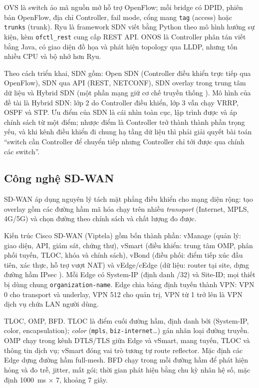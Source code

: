 OVS \citep{pfaff2015ovs, ovs_docs} là switch ảo mã nguồn mở hỗ trợ OpenFlow; mỗi bridge có DPID, phiên bản OpenFlow, địa chỉ Controller, fail mode, cổng mang \texttt{tag} (access) hoặc \texttt{trunks} (trunk). Ryu \citep{ryu_434_docs} là framework SDN viết bằng Python theo mô hình hướng sự kiện, kèm \texttt{ofctl\_rest} cung cấp REST API. ONOS \citep{onos_docs} là Controller phân tán viết bằng Java, có giao diện đồ họa và phát hiện topology qua LLDP, nhưng tốn nhiều CPU và bộ nhớ hơn Ryu.

Theo cách triển khai, SDN gồm: Open SDN (Controller điều khiển trực tiếp qua OpenFlow), SDN qua API (REST, NETCONF), SDN overlay trong trung tâm dữ liệu và Hybrid SDN (một phần mạng giữ cơ chế truyền thống \citep{vissicchio2014hybrid}). Mô hình của đề tài là Hybrid SDN: lớp 2 do Controller điều khiển, lớp 3 vẫn chạy VRRP, OSPF và STP. Ưu điểm của SDN là cái nhìn toàn cục, lập trình được và áp chính sách từ một điểm; nhược điểm là Controller trở thành thành phần trọng yếu, và khi kênh điều khiển đi chung hạ tầng dữ liệu thì phải giải quyết bài toán ``switch cần Controller để chuyển tiếp nhưng Controller chỉ tới được qua chính các switch''.

\subsection{Công nghệ SD-WAN}

SD-WAN \citep{yang2019sdwan, fu2024sdwan} áp dụng nguyên lý tách mặt phẳng điều khiển cho mạng diện rộng: tạo overlay gồm các đường hầm mã hóa chạy trên nhiều \textit{transport} (Internet, MPLS, 4G/5G) và chọn đường theo chính sách và chất lượng đo được.

Kiến trúc Cisco SD-WAN (Viptela) \citep{cisco_sdwan_design} gồm bốn thành phần: vManage (quản lý: giao diện, API, giám sát, chứng thư), vSmart (điều khiển: trung tâm OMP, phân phối tuyến, TLOC, khóa và chính sách), vBond (điều phối: điểm tiếp xúc đầu tiên, xác thực, hỗ trợ vượt NAT) và vEdge/cEdge (dữ liệu: router tại site, dựng đường hầm IPsec \citep{rfc4301_ipsec, rfc4303_esp}). Mỗi Edge có System-IP (định danh /32) và Site-ID; mọi thiết bị dùng chung \texttt{organization-name}. Edge chia bảng định tuyến thành VPN: VPN 0 cho transport và underlay, VPN 512 cho quản trị, VPN từ 1 trở lên là VPN dịch vụ chứa LAN người dùng.

TLOC, OMP, BFD. TLOC là điểm cuối đường hầm, định danh bởi (System-IP, color, encapsulation); \textit{color} (\texttt{mpls}, \texttt{biz-internet}\ldots) gán nhãn loại đường truyền. OMP \citep{cisco_sdwan_omp} chạy trong kênh DTLS/TLS giữa Edge và vSmart, mang tuyến, TLOC và thông tin dịch vụ; vSmart đóng vai trò tương tự route reflector. Mặc định các Edge dựng đường hầm full-mesh. BFD \citep{rfc5880_bfd} chạy trong mỗi đường hầm để phát hiện hỏng và đo trễ, jitter, mất gói; thời gian phát hiện bằng chu kỳ nhân hệ số, mặc định 1000~ms $\times$ 7, khoảng 7 giây.


